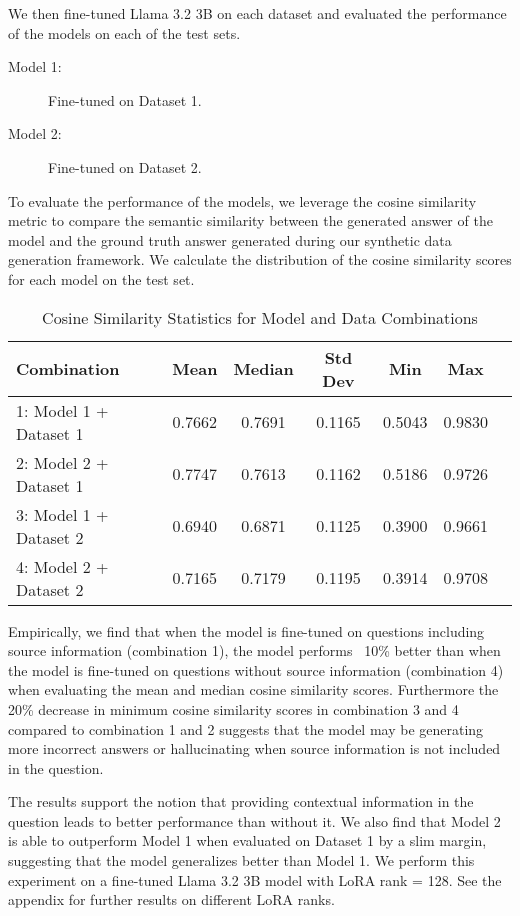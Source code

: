 We then fine-tuned Llama 3.2 3B on each dataset and evaluated the performance of the models on each of the 
test sets. 
\begin{description}
    \item[Model 1:] Fine-tuned on Dataset 1.
    \item[Model 2:] Fine-tuned on Dataset 2.
\end{description}

To evaluate the performance of the models, we leverage the cosine similarity metric to compare the semantic similarity
between the generated answer of the model and the ground truth answer generated during our synthetic data generation framework. 
We calculate the distribution of the cosine similarity scores for each model on the test set.

\begin{table}[h!]
\centering
\caption{Cosine Similarity Statistics for Model and Data Combinations}
\label{tab:cosine_similarity}
\begin{tabular}{lcccccc}
\hline
\textbf{Combination} & \textbf{Mean} & \textbf{Median} & \textbf{Std Dev} & \textbf{Min} & \textbf{Max} \\
\hline
1: Model 1 + Dataset 1 & 0.7662 & 0.7691 & 0.1165 & 0.5043 & 0.9830 \\
2: Model 2 + Dataset 1 & 0.7747 & 0.7613 & 0.1162 & 0.5186 & 0.9726 \\
3: Model 1 + Dataset 2 & 0.6940 & 0.6871 & 0.1125 & 0.3900 & 0.9661 \\
4: Model 2 + Dataset 2 & 0.7165 & 0.7179 & 0.1195 & 0.3914 & 0.9708 \\
\hline
\end{tabular}
\end{table}

Empirically, we find that when the model is fine-tuned on questions including source information (combination 1), 
the model performs ~10\% better than when the model is fine-tuned on questions without source information (combination 4)
when evaluating the mean and median cosine similarity scores. Furthermore the 20\% decrease in minimum cosine 
similarity scores in combination 3 and 4 compared to combination 1 and 2 suggests that the model may be generating 
more incorrect answers or hallucinating when source information is not included in the question.

The results support the notion that providing contextual information in the question leads to better performance than without it. 
We also find that Model 2 is able to outperform Model 1 when evaluated on Dataset 1 by a slim margin, 
suggesting that the model generalizes better than Model 1. We perform this experiment on a fine-tuned Llama 3.2 3B model with 
LoRA rank = 128. See the appendix for further results on different LoRA ranks.